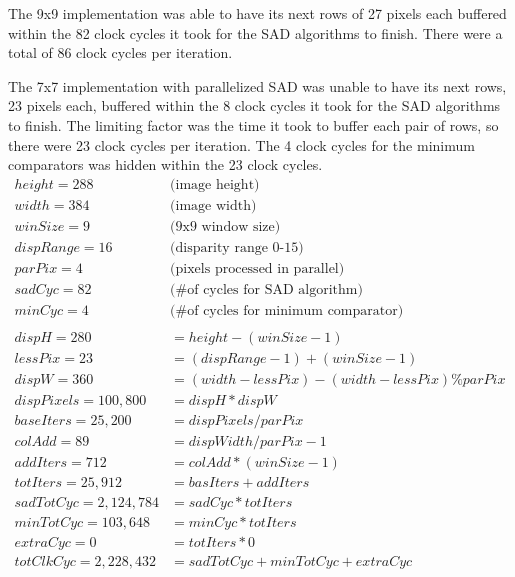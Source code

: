 The 9x9 implementation was able to have its next rows of 27 pixels each buffered within the 82 clock cycles it took for the SAD algorithms to finish. There were a total of 86 clock cycles per iteration.

The 7x7 implementation with parallelized SAD was unable to have its next rows, 23 pixels each, buffered within the 8 clock cycles it took for the SAD algorithms to finish. The limiting factor was the time it took to buffer each pair of rows, so there were 23 clock cycles per iteration. The 4 clock cycles for the minimum comparators was hidden within the 23 clock cycles.\\

\begin{subequations}
\begin{align}
	height = 288 	\qquad & \text{(image height)} \label{eq:a}\\
	width = 384 	\qquad & \text{(image width)} \label{eq:b}\\
	winSize = 9	 	\qquad & \text{(9x9 window size)} \label{eq:c}\\
	dispRange = 16 	\qquad & \text{(disparity range 0-15)} \label{eq:d}\\
	parPix = 4 		\qquad & \text{(pixels processed in parallel)} \label{eq:e}\\
	sadCyc = 82		\qquad & \text{(\# of cycles for SAD algorithm)} \label{eq:f}\\
	minCyc = 4		\qquad & \text{(\# of cycles for minimum comparator)} \label{eq:g}\\ 
	\nonumber\\
	dispH = 280 &= height - (winSize - 1) \label{eq:h}\\
	lessPix = 23 &= (dispRange-1) + (winSize-1) \label{eq:i}\\
	dispW = 360 &= (width-lessPix) - (width-lessPix) \% parPix \label{eq:j}\\
	dispPixels = 100,800 &= dispH * dispW \label{eq:k}\\
	baseIters = 25,200 &= dispPixels / parPix \label{eq:l}\\
	colAdd = 89 &= dispWidth / parPix - 1 \label{eq:m}\\
	addIters = 712 &= colAdd * (winSize-1) \label{eq:n}\\
	totIters = 25,912 &= basIters + addIters \label{eq:o}\\
	sadTotCyc = 2,124,784 &= sadCyc * totIters \label{eq:p}\\
	minTotCyc = 103,648 &= minCyc * totIters \label{eq:q}\\
	extraCyc = 0 &= totIters * 0 \label{eq:r}\\
	totClkCyc = 2,228,432 &= sadTotCyc + minTotCyc + extraCyc \label{eq:s}
\end{align}
	\label{eq:clockCycles}
\end{subequations}


